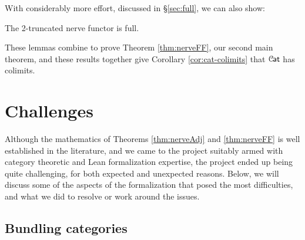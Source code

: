 \documentclass[a4paper,UKenglish,cleveref, autoref, thm-restate]{lipics-v2021}
\newcommand{\cat}[1]{\textup{\textsf{#1}}}%
\newcommand{\1}{\mathbbe{1}}
\newcommand{\2}{\mathbbe{2}}
\newcommand{\3}{\mathbbe{3}}
\newcommand{\Cat}{\mathcal{C}{\kern-.75pt}\cat{at}}
\newcommand{\rightharpoons}{\mathrel{\mathrlap{\raisebox{0.7pt}{\ensuremath{\rightharpoonup}}}{\raisebox{-0.7pt}{\ensuremath{\rightharpoondown}}}}}
\newcommand{\fixme}[1]{}
\newcommand{\libmathlib}{\href{https://github.com/leanprover-community/mathlib}{\textsf{mathlib}}}
\newcommand{\cdoc}[2][]{\href{https://leanprover-community.github.io/mathlib4_docs/find/?pattern=CategoryTheory.#1#2\#doc}{\texttt{#2}}}
\newcommand{\cdocTwo}[3][]{\href{https://leanprover-community.github.io/mathlib4_docs/find/?pattern=CategoryTheory.#1#2\%E2\%82\%82#3\#doc}{\texttt{#2${}_2$#3}}}
\begin{document}
With considerably more effort, discussed in \S\ref{sec:full}, we can also show:

\begin{lemma}[\cdocTwo{nerveFunctor}{.full}]\label{lem:nerve2-full}
The 2-truncated nerve functor is full.
\end{lemma}

These lemmas combine to prove Theorem \ref{thm:nerveFF}, our second main theorem, and these results together give Corollary \ref{cor:cat-colimits} that $\Cat$ has colimits.

\section{Challenges}\label{sec:challenges}

Although the mathematics of Theorems \ref{thm:nerveAdj} and \ref{thm:nerveFF} is well established in the literature, and we came to the project suitably armed with category theoretic and Lean formalization expertise, the project ended up being quite challenging, for both expected and unexpected reasons. Below, we will discuss some of the aspects of the formalization that posed the most difficulties, and what we did to resolve or work around the issues.

\subsection{Bundling categories}\label{sec:expected-challenges}


\end{document}
